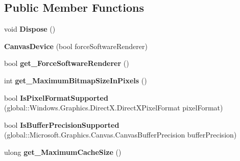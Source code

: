 \subsection*{Public Member Functions}
\begin{DoxyCompactItemize}
\item 
\mbox{\label{class_microsoft_1_1_graphics_1_1_canvas_1_1_canvas_device_a9613f1f6bab02464823bd1e9d55c8374}} 
void {\bfseries Dispose} ()
\item 
\mbox{\label{class_microsoft_1_1_graphics_1_1_canvas_1_1_canvas_device_a92581b24422598de5948e89c9ba6eb53}} 
{\bfseries Canvas\+Device} (bool force\+Software\+Renderer)
\item 
\mbox{\label{class_microsoft_1_1_graphics_1_1_canvas_1_1_canvas_device_a0583e03d53b172ea1a1220e1df5b2616}} 
bool {\bfseries get\+\_\+\+Force\+Software\+Renderer} ()
\item 
\mbox{\label{class_microsoft_1_1_graphics_1_1_canvas_1_1_canvas_device_af71c8661ed6a571c7678dfcd97de7bc8}} 
int {\bfseries get\+\_\+\+Maximum\+Bitmap\+Size\+In\+Pixels} ()
\item 
\mbox{\label{class_microsoft_1_1_graphics_1_1_canvas_1_1_canvas_device_a01381b0e199054ee3d65ce1d6916972f}} 
bool {\bfseries Is\+Pixel\+Format\+Supported} (global\+::\+Windows.\+Graphics.\+Direct\+X.\+Direct\+X\+Pixel\+Format pixel\+Format)
\item 
\mbox{\label{class_microsoft_1_1_graphics_1_1_canvas_1_1_canvas_device_a05ed962d04bfea58842bb028fe6b8c4e}} 
bool {\bfseries Is\+Buffer\+Precision\+Supported} (global\+::\+Microsoft.\+Graphics.\+Canvas.\+Canvas\+Buffer\+Precision buffer\+Precision)
\item 
\mbox{\label{class_microsoft_1_1_graphics_1_1_canvas_1_1_canvas_device_a5f095678b43b4ace5f118aa2556deffe}} 
ulong {\bfseries get\+\_\+\+Maximum\+Cache\+Size} ()

\end{DoxyCompactItemize}
